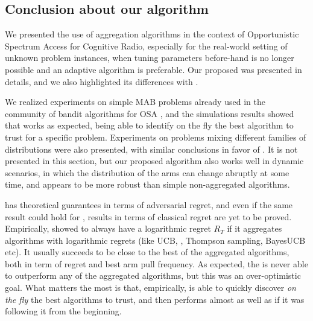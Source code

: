 \subsection{Conclusion about our \Aggr{} algorithm}\label{sub:25:conclusion}

We presented the use of aggregation algorithms in the context of Opportunistic Spectrum Access for Cognitive Radio,
especially for the real-world setting of unknown problem instances,
when tuning parameters before-hand is no longer possible and an adaptive algorithm is preferable.
Our proposed \Aggr{} was presented in details,
and we also highlighted its differences with \ExpQ.

We realized experiments on simple MAB problems already used in the community of bandit algorithms for OSA \cite{Jouini10},
and the simulations results showed that \Aggr{} works as expected, being able to identify on the fly the best algorithm to trust for a specific problem.
Experiments on problems mixing different families of distributions were also presented, with similar conclusions in favor of \Aggr.
It is not presented in this section, but our proposed algorithm also works well in dynamic scenarios, in which the distribution of the arms can change abruptly at some time,
and appears to be more robust than simple non-aggregated algorithms.

\ExpQ{} has theoretical guarantees in terms of adversarial regret, and even if the same result could hold for \Aggr, results in terms of classical regret are yet to be proved.
Empirically, \Aggr{} showed to always have a logarithmic
regret $R_T$ if it aggregates algorithms with logarithmic regrets (like UCB, \klUCB, Thompson sampling, BayesUCB etc).
It usually succeeds to be close to the best of the aggregated algorithms, both in term of regret and best arm pull frequency.
As expected, the \Aggr{} is never able to outperform any of the aggregated algorithms, but this was an over-optimistic goal.
%
What matters the most is that, empirically, \Aggr{} is able to quickly discover \emph{on the fly} the best algorithms to trust, and then performs almost as well as if it was following it from the beginning.


